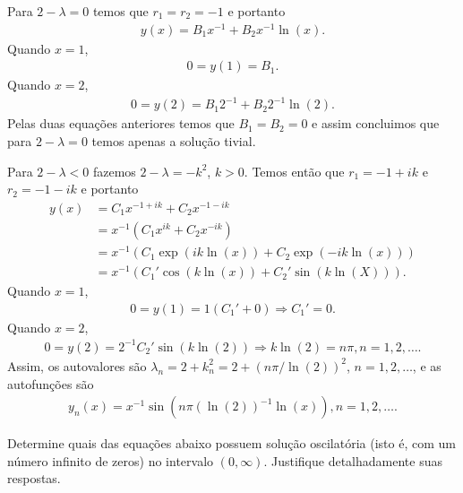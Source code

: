 \documentclass[a4paper,12pt, leqno, answers]{exam}
\begin{document}
\begin{questions}
\begin{solution}
        Para $2 - \lambda = 0$ temos que $r_1 = r_2 = -1$ e portanto
        \begin{align*}
            y(x) = B_1 x^{-1} + B_2 x^{-1} \ln(x).
        \end{align*}
        Quando $x = 1$,
        \begin{align*}
            0 = y(1) = B_1.
        \end{align*}
        Quando $x = 2$,
        \begin{align*}
            0 = y(2) = B_1 2^{-1} + B_2 2^{-1} \ln(2).
        \end{align*}
        Pelas duas equa\c{c}\~{o}es anteriores temos que $B_1 = B_2 = 0$ e assim concluimos que para $2 - \lambda = 0$ temos apenas a solu\c{c}\~{a}o tivial.

        Para $2 - \lambda < 0$ fazemos $2 - \lambda = - k^2$, $k > 0$. Temos ent\~{a}o que $r_1 = -1 + i k$ e $r_2 = -1 - i k$ e portanto
        \begin{align*}
            y(x) &= C_1 x^{-1 + i k} + C_2 x^{-1 - i k} \\
            &= x^{-1} \left( C_1 x^{i k} + C_2 x^{-i k} \right) \\
            &= x^{-1} \left( C_1 \exp(i k \ln(x)) + C_2 \exp(-i k \ln(x)) \right) \\
            &= x^{-1} \left( C_1' \cos(k \ln(x)) + C_2' \sin(k \ln(X)) \right).
        \end{align*}
        Quando $x = 1$,
        \begin{align*}
            0 = y(1) = 1 \left( C_1' + 0 \right) \Rightarrow C_1' = 0.
        \end{align*}
        Quando $x = 2$,
        \begin{align*}
            0 = y(2) = 2^{-1} C_2' \sin(k \ln(2)) \Rightarrow k \ln(2) = n \pi, n = 1, 2, \ldots.
        \end{align*}
        Assim, os autovalores s\~{a}o $\lambda_n = 2 + k_n^2 = 2 + (n \pi / \ln(2))^2$, $n = 1, 2, \ldots$, e as autofun\c{c}\~{o}es s\~{a}o
        \begin{align*}
            y_n(x) = x^{-1} \sin \left( n \pi (\ln(2))^{-1} \ln(x) \right), n = 1, 2, \ldots.
        \end{align*}
    \end{solution}

    \question[T4 de 2010] Determine quais das equa\c{c}\~{o}es abaixo possuem solu\c{c}\~{a}o oscilat\'{o}ria (isto \'{e}, com um n\'{u}mero infinito de zeros) no intervalo $(0, \infty)$. Justifique detalhadamente suas respostas.
    \begin{parts}

\end{parts}
\end{questions}
\end{document}
